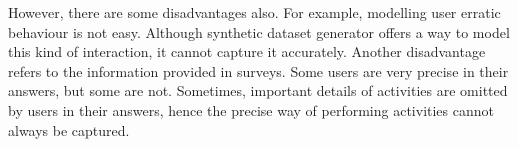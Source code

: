 However, there are some disadvantages also. For example, modelling user erratic behaviour is not easy. Although synthetic dataset generator offers a way to model this kind of interaction, it cannot capture it accurately. Another disadvantage refers to the information provided in surveys. Some users are very precise in their answers, but some are not. Sometimes, important details of activities are omitted by users in their answers, hence the precise way of performing activities cannot always be captured.